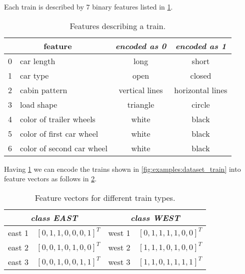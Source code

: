 Each train is described by $ 7 $ binary features listed in \cref{tab:examples:train_features}.

\begin{table}[H]
\centering
\begin{tabular}{|c|l|c|c|}
\hline
\multicolumn{2}{|c|}{feature} & \textit{encoded as \textbf{0}} & \textit{encoded as \textbf{1}} \\ \hline \hline
0 & car length                & long                  & short                 \\ \hline
1 & car type                  & open                  & closed                \\ \hline
2 & cabin pattern             & vertical lines        & horizontal lines      \\ \hline
3 & load shape                & triangle              & circle                \\ \hline
4 & color of trailer wheels   & white                 & black                 \\ \hline
5 & color of first car wheel  & white                 & black                 \\ \hline
6 & color of second car wheel & white                 & black                 \\ \hline
\end{tabular}
\caption{Features describing a train.}
\label{tab:examples:train_features}
\end{table}

Having \cref{tab:examples:train_features} we can encode the trains shown in \cref{fig:examples:dataset_train} into feature vectors as follows in \cref{tab:examples:train_feature_vectors}.

\begin{table}[H]
\centering
\begin{tabular}{|l|c|l|c|}
\hline
\multicolumn{2}{|c|}{\textit{class EAST}} & \multicolumn{2}{c|}{\textit{class WEST}} \\ \hline
east 1    & $ [0, 1, 1, 0, 0, 0, 1]^T $   & west 1   & $ [0, 1, 1, 1, 1, 0, 0]^T $   \\ \hline
east 2    & $ [0, 0, 1, 0, 1, 0, 0]^T $   & west 2   & $ [1, 1, 1, 0, 1, 0, 0]^T $   \\ \hline
east 3    & $ [0, 0, 1, 0, 0, 1, 1]^T $   & west 3   & $ [1, 1, 0, 1, 1, 1, 1]^T $   \\ \hline
\end{tabular}
\caption{Feature vectors for different train types.}
\label{tab:examples:train_feature_vectors}
\end{table}

